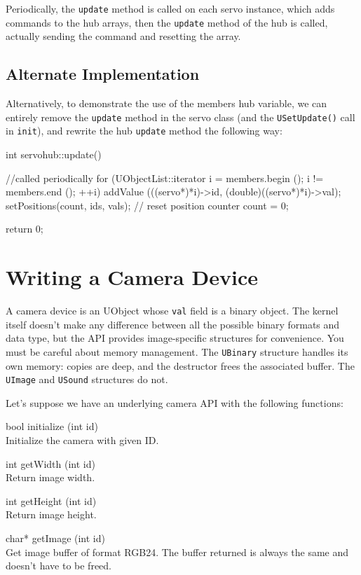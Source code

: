Periodically, the \lstinline{update} method is called on each servo
instance, which adds commands to the hub arrays, then the
\lstinline{update} method of the hub is called, actually sending the
command and resetting the array.

\subsection{Alternate Implementation}

Alternatively, to demonstrate the use of the members hub variable, we
can entirely remove the \lstinline{update} method in the servo class
(and the \lstinline{USetUpdate()} call in \lstinline{init}), and
rewrite the hub \lstinline{update} method the following way:

\begin{cxx}
int servohub::update()
{
  //called periodically
  for (UObjectList::iterator i = members.begin ();
       i != members.end ();
       ++i)
    addValue (((servo*)*i)->id, (double)((servo*)*i)->val);
  setPositions(count, ids, vals);
  // reset position counter
  count = 0;

  return 0;
}
\end{cxx}

\section{Writing a Camera Device}

A camera device is an UObject whose \lstinline{val} field is a binary
object. The \urbi kernel itself doesn't make any difference between
all the possible binary formats and data type, but the API provides
image-specific structures for convenience. You must be careful about
memory management. The \lstinline{UBinary} structure handles its own
memory: copies are deep, and the destructor frees the associated
buffer. The \lstinline{UImage} and \lstinline{USound} structures do
not.

Let's suppose we have an underlying camera API with the following functions:
\begin{cxxapi}
\item[bool initialize (int id)]\\
  Initialize the camera with given ID.
\item[int getWidth (int id)]\\
  Return image width.
\item[int getHeight (int id)]\\
  Return image height.
\item[char* getImage (int id)]\\
  Get image buffer of format RGB24.  The buffer returned is always the
  same and doesn't have to be freed.
\end{cxxapi}

